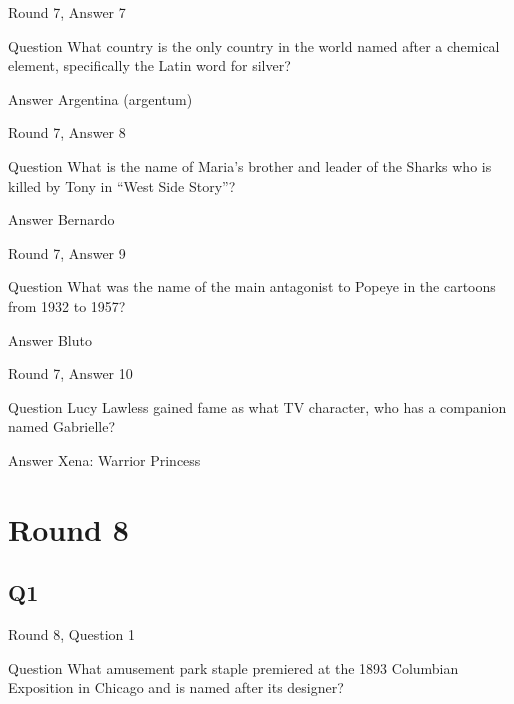 \documentclass[11pt]{beamer}
\begin{document}
\begin{frame}[t]{Round 7, Answer 7}
\vspace{2em}
\begin{block}{Question}
What country is the only country in the world named after a chemical element, specifically the Latin word for silver\@?
\end{block}
\pause{}
\begin{block}{Answer}
Argentina (argentum)
\end{block}
\end{frame}
    

\begin{frame}[t]{Round 7, Answer 8}
\vspace{2em}
\begin{block}{Question}
What is the name of Maria's brother and leader of the Sharks who is killed by Tony in ``West Side Story''\@?
\end{block}
\pause{}
\begin{block}{Answer}
Bernardo
\end{block}
\end{frame}
    

\begin{frame}[t]{Round 7, Answer 9}
\vspace{2em}
\begin{block}{Question}
What was the name of the main antagonist to Popeye in the cartoons from 1932 to 1957\@?
\end{block}
\pause{}
\begin{block}{Answer}
Bluto
\end{block}
\end{frame}
    

\begin{frame}[t]{Round 7, Answer 10}
\vspace{2em}
\begin{block}{Question}
Lucy Lawless gained fame as what TV character, who has a companion named Gabrielle\@?
\end{block}
\pause{}
\begin{block}{Answer}
Xena: Warrior Princess
\end{block}
\end{frame}
    

\section{Round 8}
    

\subsection*{Q1}
\begin{frame}[t]{Round 8, Question 1}
\vspace{2em}
\begin{block}{Question}
What amusement park staple premiered at the 1893 Columbian Exposition in Chicago and is named after its designer\@?
\end{block}
\end{frame}
    
\end{document}
